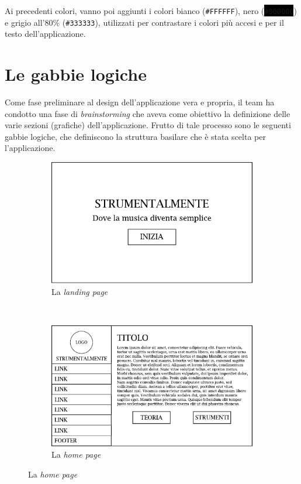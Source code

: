 Ai precedenti colori, vanno poi aggiunti i colori bianco
(\colorbox[HTML]{FFFFFF}{\texttt{\#FFFFFF}}), nero
(\colorbox{black}{\color{white}\texttt{\#000000}}) e grigio all'80\%
(\colorbox[HTML]{333333}{\color{white}\texttt{\#333333}}), utilizzati per
contrastare i colori più accesi e per il testo dell'applicazione.

\section{Le gabbie logiche}

Come fase preliminare al design dell'applicazione vera e propria, il team ha
condotto una fase di \emph{brainstorming} che aveva come obiettivo la
definizione delle varie sezioni (grafiche) dell'applicazione. Frutto di tale
processo sono le seguenti gabbie logiche, che definiscono la struttura basilare
che è stata scelta per l'applicazione.
\clearpage
\vspace*{\fill}
\begin{figure}[H]
	\centering
	\label{fig:gabbie-logiche}
	\caption{Le gabbie logiche di \ProjectTitle{}}
	\begin{subfigure}[t]{\textwidth}
		\centering
		\includegraphics[width=\textwidth]{gabbie_logiche/Landing_Page}
		\caption{La \emph{landing page}}
	\end{subfigure}
	~\vskip40pt
	\begin{subfigure}[t]{\textwidth}
		\centering
		\includegraphics[width=\textwidth]{gabbie_logiche/Home}
		\caption{La \emph{home page}}
	\end{subfigure}
\end{figure}

